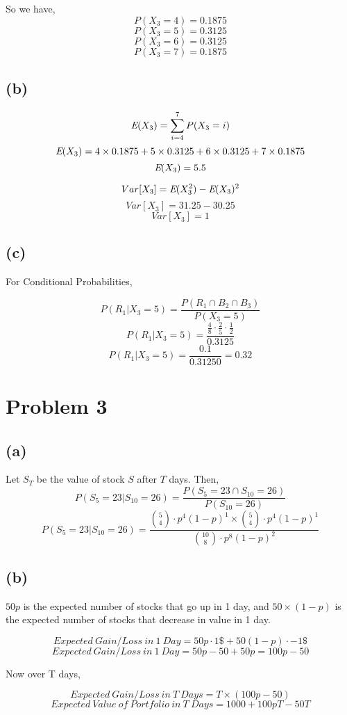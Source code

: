 \documentclass{article}
\begin{document}
			So we have,
			$$ P(X_3 = 4)= 0.1875 $$
			$$ P(X_3 = 5)= 0.3125$$
			$$ P(X_3 = 6)= 0.3125$$
			$$ P(X_3 = 7)= 0.1875$$

		\subsection*{(b)}
			$$ \emph{E}(X_3) = \sum_{i=4}^7 P(X_3=i) $$
			$$ \emph{E}(X_3) = 4 \times 0.1875 + 5 \times 0.3125 + 6 \times 0.3125 + 7 \times 0.1875 $$
			$$ \emph{E}(X_3) = 5.5 $$

			$$ Var[X_3] = \emph{E}(X_3^2) - \emph{E}(X_3)^2 $$
			$$ Var[X_3] = 31.25 - 30.25 $$
			$$ Var[X_3] = 1 $$

		\subsection*{(c)}
			For Conditional Probabilities,

			$$ P(R_1|X_3 = 5) = \frac{P(R_1 \cap B_2 \cap B_3)}{P(X_3 = 5)}$$
			$$ P(R_1|X_3 = 5) = \frac{\frac{4}{8}\cdot \frac{2}{5}\cdot \frac{1}{2}}{0.3125}$$
			$$ P(R_1|X_3 = 5) = \frac{0.1}{0.31250}  = 0.32 $$


	\section*{Problem 3}
		\subsection*{(a)}
			Let $S_T$ be the value of stock $S$ after $T$ days. Then,
			$$ P(S_5=23|S_{10}=26) = \frac{P(S_5 = 23 \cap S_{10}=26)}{P(S_{10}=26)} $$
			$$ P(S_5=23|S_{10}=26) = \frac{{5 \choose 4} \cdot p^4 (1-p)^1 \times {5 \choose 4}\cdot p^4 (1-p)^1 }{{10 \choose 8}\cdot p^8 (1-p)^2} $$

		\subsection*{(b)}
			$50p$ is the expected number of stocks that go up in 1 day, and $50 \times (1-p)$ is the expected number of stocks that decrease in value in 1 day.
			
			$$ Expected\ Gain/Loss\ in\ 1\ Day = 50p \cdot 1 \$ + 50(1-p) \cdot -1 \$ $$ 
			$$Expected\ Gain/Loss\ in\ 1\ Day = 50p - 50 +50p = 100p-50 $$

			Now over T days,
	
			$$Expected\ Gain/Loss\ in\ T\ Days = T \times (100p -50) $$
			$$ Expected\ Value\ of\ Portfolio\ in\ T\ Days = 1000+ 100pT - 50T $$
\end{document}
